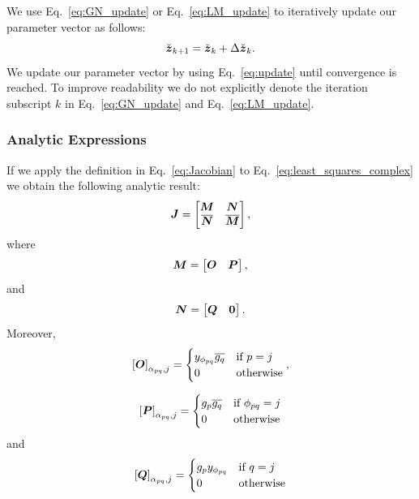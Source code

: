 \documentclass[useAMS,usenatbib]{mn2e}
\newcommand{\bz}{\bmath{z}}
\newcommand{\bJ}{\bmath{J}}
\newcommand{\bN}{\bmath{N}}
\newcommand{\bM}{\bmath{M}}
\newcommand{\bO}{\bmath{O}}
\newcommand{\bP}{\bmath{P}}
\newcommand{\bQ}{\bmath{Q}}
\newcommand{\bzero}{\bmath{0}}
\newcommand{\conj}[1]{\overline{#1}}
\begin{document}
We use Eq.~\eqref{eq:GN_update} or Eq.~\eqref{eq:LM_update} to iteratively update our 
parameter vector as follows:
\begin{equation}
\label{eq:update}
\breve{\bz}_{k+1} = \breve{\bz}_{k} + \Delta \breve{\bz}_{k}. 
\end{equation}
We update our parameter vector by using Eq.~\eqref{eq:update} until convergence is reached. To improve readability we do not explicitly denote the iteration subscript $k$ in 
Eq.~\eqref{eq:GN_update} and Eq.~\eqref{eq:LM_update}.

\subsubsection{Analytic Expressions}
If we apply the definition in Eq.~\eqref{eq:Jacobian} to Eq.~\eqref{eq:least_squares_complex} we obtain the following analytic result:
\begin{equation}
\label{eq:Jacobian_red}
\bJ = \begin{bmatrix}
       \bM & \bN\\
       \conj{\bN} & \conj{\bM}
      \end{bmatrix},
\end{equation}
where
\begin{equation}
\bM =\begin{bmatrix}
      \bO & \bP
     \end{bmatrix},
\end{equation}
and 
\begin{equation}
\bN = \begin{bmatrix}
       \bQ & \bzero
      \end{bmatrix}.
\end{equation}
Moreover,
\begin{equation}
\left [ \bO  \right ]_{\alpha_{pq},j} = \begin{cases}
                                         y_{\phi_{pq}}\conj{g_q} & \textrm{if}~p=j\\
                                         0  & \textrm{otherwise} 
                                        \end{cases},
\end{equation}

\begin{equation}
\left [ \bP  \right ]_{\alpha_{pq},j} = \begin{cases}
                                         g_p\conj{g_q} & \textrm{if}~\phi_{pq}=j\\
                                         0  & \textrm{otherwise} 
                                        \end{cases}
\end{equation}
and
\begin{equation}
\left [ \bQ  \right ]_{\alpha_{pq},j} = \begin{cases}
                                         g_py_{\phi_{pq}} & \textrm{if}~q=j\\
                                         0  & \textrm{otherwise} 
                                        \end{cases}
\end{equation}
\end{document}
